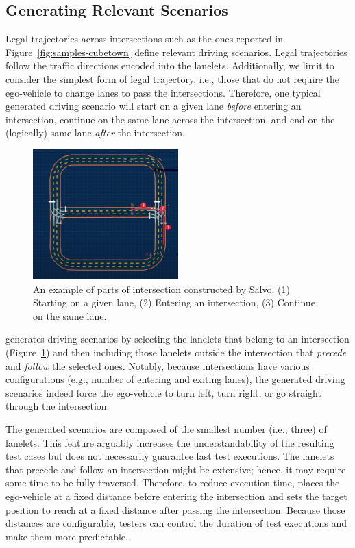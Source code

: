 \documentclass[conference]{IEEEtran}
\begin{document}
\subsection{Generating Relevant Scenarios}
Legal trajectories across intersections such as the ones reported in Figure~\ref{fig:samples-cubetown} define relevant driving scenarios. Legal trajectories follow the traffic directions encoded into the lanelets. Additionally, we limit \tool to consider the simplest form of legal trajectory, i.e., those that do not require the ego-vehicle to change lanes to pass the intersections. Therefore, one typical generated driving scenario will start on a given lane \emph{before} entering an intersection, continue on the same lane across the intersection, and end on the (logically) same lane \emph{after} the intersection.
%
\begin{figure}[H]
  \centering
    \includegraphics[width=0.5\textwidth]{images/lanelet01}
  \caption{An example of parts of intersection constructed by Salvo. (1) Starting on a given lane, (2) Entering an intersection, (3) Continue on the same lane.}
  \label{fig:intersection_sf}
\end{figure}

\tool generates driving scenarios by selecting the lanelets that belong to an intersection (Figure~\ref{fig:intersection_sf}) and then including those lanelets outside the intersection that \emph{precede} and \emph{follow} the selected ones. Notably, because intersections have various configurations (e.g., number of entering and exiting lanes), the generated driving scenarios indeed force the ego-vehicle to turn left, turn right, or go straight through the intersection.

The generated scenarios are composed of the smallest number (i.e., three) of lanelets. This feature arguably increases the understandability of the resulting test cases but does not necessarily guarantee fast test executions. The lanelets that precede and follow an intersection might be extensive; hence, it may require some time to be fully traversed. Therefore, to reduce execution time, \tool places the ego-vehicle at a fixed distance before entering the intersection and sets the target position to reach at a fixed distance after passing the intersection. Because those distances are configurable, testers can control the duration of test executions and make them more predictable.
\end{document}
